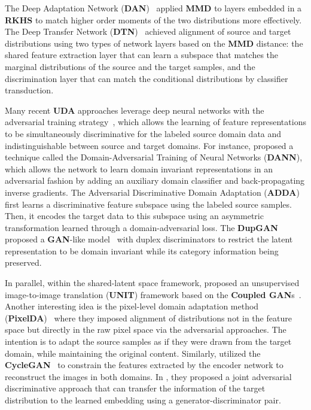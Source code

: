 \documentclass[10pt,letterpaper]{article}
\begin{document}
The Deep Adaptation Network (\textbf{DAN})~\cite{long2015learning} applied \textbf{MMD} to layers embedded in a \textbf{RKHS} to match higher order moments of the two distributions more effectively. The Deep Transfer Network (\textbf{DTN})~\cite{zhang2015deep} achieved alignment of source and target distributions using two types of network layers based on the \textbf{MMD} distance: the shared feature extraction layer that can learn a subspace that matches the marginal distributions of the source and the target samples, and the discrimination layer that can match the conditional distributions by classifier transduction.

Many recent \textbf{UDA} approaches leverage deep neural networks with the adversarial training strategy~\cite{rebuffi2017learning,benaim2017one,courty2017joint,motiian2017few,saito2017asymmetric,Zhang_2017_CVPR}, which allows the learning of feature representations to be simultaneously discriminative for the labeled source domain data and indistinguishable between source and target domains. For instance, \cite{ganin2014unsupervised} proposed a technique called the Domain-Adversarial Training of Neural Networks (\textbf{DANN}), which allows the network to learn domain invariant representations in an adversarial fashion by adding an auxiliary domain classifier and back-propagating inverse gradients. The Adversarial Discriminative Domain  Adaptation (\textbf{ADDA})~\cite{tzeng2017adversarial} first learns a discriminative feature subspace using the labeled source samples. Then, it encodes the target data to this subspace using an asymmetric transformation learned through a domain-adversarial loss. The \textbf{DupGAN}~\cite{hu2018duplex} proposed a \textbf{GAN}-like model~\cite{gan14} with duplex discriminators to restrict the latent representation to be domain invariant while its category information being preserved.

In parallel, within the shared-latent space framework, \cite{liu2017unsupervised} proposed an unsupervised image-to-image translation (\textbf{UNIT}) framework based on the \textbf{Coupled GAN}s~\cite{NIPS2016_6544}.  Another interesting idea is the pixel-level domain adaptation method (\textbf{PixelDA})~\cite{bousmalis2017unsupervised} where they imposed alignment of distributions not in the feature space but directly in the raw pixel space via the adversarial approaches. The intention is to adapt the source samples as if they were drawn from the target domain, while maintaining the original content. Similarly, \cite{murez2017image} utilized the \textbf{CycleGAN}~\cite{zhu2017unpaired} to constrain the features extracted by the encoder network to reconstruct the images in both domains. In \cite{sankaranarayanan2017generate}, they proposed a joint adversarial discriminative approach that can transfer the information of the target distribution to the learned embedding using a generator-discriminator pair.
\end{document}
